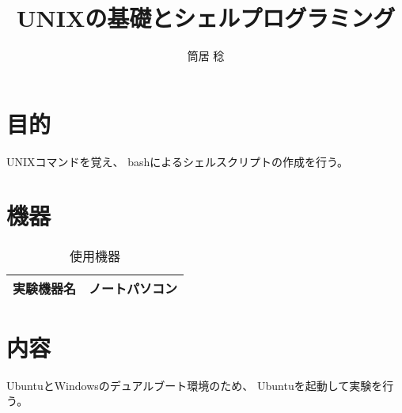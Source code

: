 \documentclass{jsarticle}
\begin{document}


\title{UNIXの基礎とシェルプログラミング}
\author{筒居 稔}
\maketitle


\section{目的}
UNIXコマンドを覚え、
bashによるシェルスクリプトの作成を行う。


\section{機器}

\begin{table}[hbtp]
 \caption{使用機器}
 \label{siyou}
 \centering
  \begin{tabular}{|c|c|}\hline
			実験機器名&ノートパソコン\\ \hline
  \end{tabular}
\end{table}

\section{内容}
UbuntuとWindowsのデュアルブート環境のため、
Ubuntuを起動して実験を行う。

\end{document}
